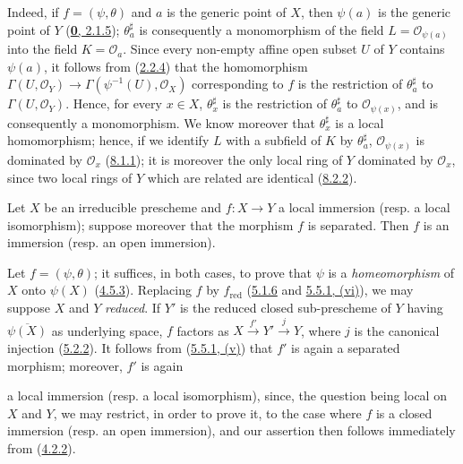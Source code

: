 Indeed, if $f=(\psi,\theta)$ and $a$ is the generic point of $X$, then
$\psi(a)$ is the generic point of $Y$
(\hyperref[0.2.1.5]{\textbf{0}, 2.1.5}); $\theta_a^\sharp$ is consequently a
monomorphism of the field $L=\mathscr{O}_{\psi(a)}$ into the field
$K=\mathscr{O}_a$. Since every non-empty affine open subset $U$ of $Y$ contains
$\psi(a)$, it follows from (\hyperref[I.2.2.4]{2.2.4}) that the
homomorphism
$\Gamma(U,\mathscr{O}_Y)\to\Gamma(\psi^{-1}(U),\mathscr{O}_X)$ corresponding
to $f$ is the restriction of $\theta_a^\sharp$ to
$\Gamma(U,\mathscr{O}_Y)$. Hence, for every $x\in X$,
$\theta_x^\sharp$ is the restriction of $\theta_a^\sharp$ to
$\mathscr{O}_{\psi(x)}$, and is consequently a monomorphism. We know moreover
that $\theta_x^\sharp$ is a local homomorphism; hence, if we identify $L$ with
a subfield of $K$ by $\theta_a^\sharp$, $\mathscr{O}_{\psi(x)}$ is dominated
by $\mathscr{O}_x$ (\hyperref[I.8.1.1]{8.1.1}); it is moreover the only
local ring of $Y$ dominated by $\mathscr{O}_x$, since two local rings of
$Y$ which are related are identical
(\hyperref[I.8.2.2]{8.2.2}).

\begin{proposition}[8.2.8]
\label{I.8.2.8}
Let $X$ be an \textup{irreducible} prescheme and $f:X\to Y$ a local immersion
\textup{(resp.} a local isomorphism); suppose moreover that the morphism $f$ is
separated. Then $f$ is an immersion \textup{(resp.} an open immersion).
\end{proposition}

Let $f=(\psi,\theta)$; it suffices, in both cases, to prove that $\psi$
is a \emph{homeomorphism} of $X$ onto $\psi(X)$
(\hyperref[I.4.5.3]{4.5.3}). Replacing $f$ by $f_{\mathrm{red}}$
(\hyperref[I.5.1.6]{5.1.6} and
\hyperref[I.5.5.1]{5.5.1, (vi)}), we may suppose $X$ and $Y$ \emph{reduced}. If
$Y'$ is the reduced closed sub-prescheme of $Y$ having
$\overline{\psi(X)}$ as underlying space, $f$ factors as
$X\xrightarrow{f'}Y'\xrightarrow{j}Y$, where $j$ is the canonical injection
(\hyperref[I.5.2.2]{5.2.2}). It follows from
(\hyperref[I.5.5.1]{5.5.1, (v)}) that $f'$ is again a separated morphism;
moreover, $f'$ is again

a local immersion (resp. a local isomorphism), since, the question being
local on $X$ and $Y$, we may restrict, in order to prove it, to the case where
$f$ is a closed immersion (resp. an open immersion), and our assertion then
follows immediately from (\hyperref[I.4.2.2]{4.2.2}).

